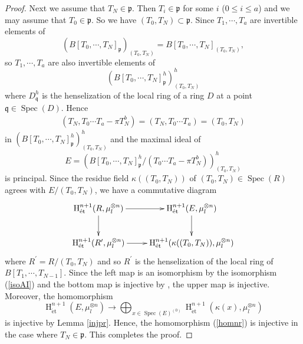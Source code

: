 \documentclass{article}
\newcommand{\spec}{\operatorname{Spec}}
\newcommand{\et}{\mathrm{\acute{e}t}}
\newcommand{\HO}{\operatorname{H}}
\begin{document}
\begin{proof}
Next we assume that $T_{N}\in \mathfrak{p}$. Then $T_{i}\in \mathfrak{p}$ for some $i$
($0\leq i\leq a$) and we may assume that $T_{0}\in \mathfrak{p}$.
So we have $(T_{0}, T_{N})\subset \mathfrak{p}$.
Since $T_{1}, \cdots, T_{a}$ are invertible elements of
%
\begin{equation*}
(B[T_{0}, \cdots, T_{N}]_{\mathfrak{p}})_{(T_{0}, T_{N})}
=
B[T_{0}, \cdots, T_{N}]_{(T_{0}, T_{N})},    
\end{equation*}
%
so $T_{1}, \cdots, T_{a}$ are also invertible elements of
%
\begin{equation*}
(B[T_{0}, \cdots, T_{N}]_{\mathfrak{p}}^{h})_{(T_{0}, T_{N})}^{h}   
\end{equation*}
%
where $D^{h}_{\mathfrak{q}}$ is the henselization of the local ring of 
a ring $D$ at a point $\mathfrak{q}\in \spec(D)$.
Hence
%
\begin{align*}
\left(
T_{N}, T_{0}\cdots T_{a}-\pi T_{N}^{b}
\right)
=
\left(
T_{N}, T_{0}\cdots T_{a}
\right)
=
(T_{0}, T_{N})
\end{align*}
%
in 
%
\begin{math}
(B[T_{0}, \cdots, T_{N}]_{\mathfrak{p}}^{h})_{(T_{0}, T_{N})}^{h}    
\end{math}
%
and the maximal ideal of 
%
\begin{equation*}
E=
\left(
B[T_{0}, \cdots, T_{N}]_{\mathfrak{p}}^{h}
/(T_{0}\cdots T_{a}-\pi T_{N}^{b})
\right)_{(T_{0}, T_{N})}^{h}
\end{equation*}
%
is principal. 
Since the residue field 
$\kappa((T_{0}, T_{N}))$
of $(T_{0}, T_{N})\in \spec(R)$
agrees with $E/(T_{0}, T_{N})$,
we have a commutative diagram
%
\begin{equation*}
\xymatrix{
\HO^{n+1}_{\et}(R, \mu_{l}^{\otimes n})
\ar[r]\ar[d]
&
\HO^{n+1}_{\et}(
E, 
\mu_{l}^{\otimes n}
)  \ar[d]
\\
\HO^{n+1}_{\et}(
R^{\prime},
\mu_{l}^{\otimes n}
)
\ar[r]
&
\HO^{n+1}_{\et}(
\kappa((T_{0}, T_{N})),
\mu_{l}^{\otimes n}
)
}    
\end{equation*}
%
where $R^{\prime}=R/(T_{0}, T_{N})$ and so $R^{\prime}$ is 
the henselization of the local ring of 
$B[T_{1}, \cdots, T_{N-1}]$.
Since the left map is an isomorphism 
by %
the isomorphism (\ref{isoAI})
and 
the bottom map is injective by \cite[p.35, Proposition 5]{SM19},
the upper map is injective. Moreover, the homomorphism
%
\begin{equation*}
\HO^{n+1}_{\et}(
E, 
\mu_{l}^{\otimes n}
)
\to 
\displaystyle\bigoplus_{x\in \spec(E)^{(0)}}
\HO^{n+1}_{\et}(
\kappa(x),
\mu_{l}^{\otimes n}
)
\end{equation*}
%
is injective by Lemma \ref{injpr}. 
Hence, the homomorphism (\ref{homnr}) is injective
in the case where $T_{N}\in \mathfrak{p}$.
This completes the proof.
\end{proof}
%
\end{document}
